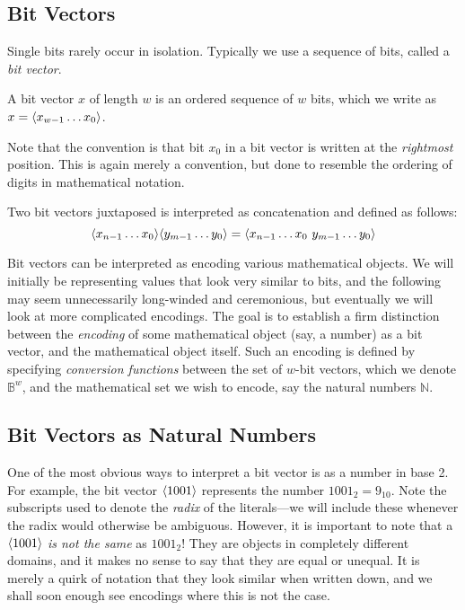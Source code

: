 \subsection{Bit Vectors}

Single bits rarely occur in isolation.  Typically we use a sequence of
bits, called a \emph{bit vector}.

\begin{definition}
  A bit vector $x$ of length $w$ is an ordered sequence of $w$ bits,
  which we write as $x=\langle x_{w-1}\ldots{}x_{0} \rangle$.
\end{definition}

Note that the convention is that bit $x_{0}$ in a bit vector is
written at the \emph{rightmost} position.  This is again merely a
convention, but done to resemble the ordering of digits in
mathematical notation.

\begin{definition}
  Two bit vectors juxtaposed is interpreted as concatenation and
  defined as follows:
  \[
    \langle x_{n-1}\ldots{}x_{0} \rangle \langle y_{m-1}\ldots{}y_{0} \rangle
    = \langle x_{n-1}\ldots{}x_{0}~y_{m-1}\ldots{}y_{0} \rangle
  \]
\end{definition}


Bit vectors can be interpreted as encoding various mathematical
objects.  We will initially be representing values that look very
similar to bits, and the following may seem unnecessarily long-winded
and ceremonious, but eventually we will look at more complicated
encodings.  The goal is to establish a firm distinction between the
\emph{encoding} of some mathematical object (say, a number) as a bit
vector, and the mathematical object itself.  Such an encoding is
defined by specifying \emph{conversion functions} between the set of
$w$-bit vectors, which we denote $\mathbb{B}^{w}$, and the
mathematical set we wish to encode, say the natural numbers
$\mathbb{N}$.

\subsection{Bit Vectors as Natural Numbers}
\label{sec:bitnats}

One of the most obvious ways to interpret a bit vector is as a number
in base 2.  For example, the bit vector $\langle 1001 \rangle$ represents
the number $1001_{2} = 9_{10}$.  Note the subscripts used to denote
the \emph{radix} of the literals---we will include these whenever the
radix would otherwise be ambiguous.  However, it is important to note
that a $\langle 1001 \rangle$ \emph{is not the same} as $1001_{2}$!  They
are objects in completely different domains, and it makes no sense to
say that they are equal or unequal.  It is merely a quirk of notation
that they look similar when written down, and we shall soon enough see
encodings where this is not the case.

